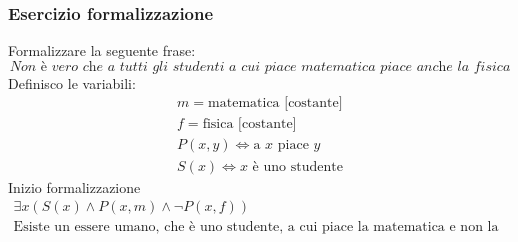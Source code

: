 \documentclass[italian]{article}
\begin{document}
\pagebreak
\subsubsection{Esercizio formalizzazione}
Formalizzare la seguente frase:
\[
	\textit{Non è vero che a tutti gli studenti a cui piace matematica piace anche la fisica}
\]
Definisco le variabili:
\begin{gather*}
	m = \text{matematica [costante]} \\
	f = \text{fisica [costante]} \\
	P(x,y) \Leftrightarrow \text{a $x$ piace $y$} \\
	S(x) \Leftrightarrow \text{$x$ è uno studente}
\end{gather*}
Inizio formalizzazione
\begin{gather*}
	\exists x(S(x) \land P(x,m) \land \lnot P(x,f)) \\
	\text{Esiste un essere umano, che è uno studente, a cui piace la matematica e non la fisica}
\end{gather*}
\end{document}
